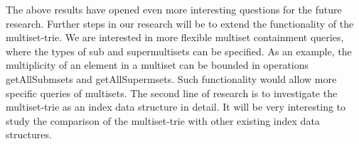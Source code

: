 %
The above results have opened even more interesting questions for the future research. 
Further steps in our research will be to extend the functionality of the multiset-trie. 
We are interested in more flexible multiset containment queries, where the types 
of sub and supermultisets can be specified. As an example, the multiplicity of an 
element in a multiset can be bounded in operations getAllSubmsets and 
getAllSupermsets. Such functionality would allow more specific queries of multisets.
%
The second line of research is to investigate the multiset-trie as an index data 
structure in detail. It will be very interesting to study the comparison of the 
multiset-trie with other existing index data structures.